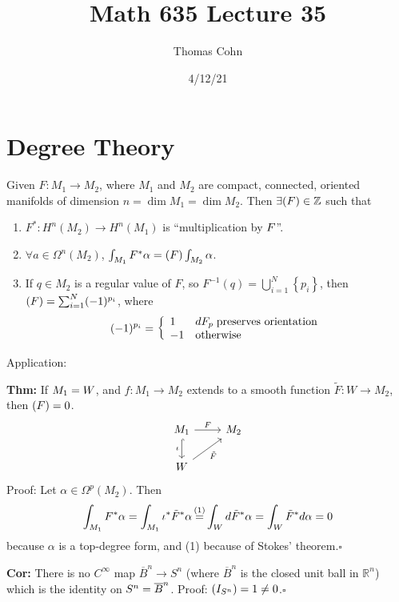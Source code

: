 \documentclass[10pt,letterpaper]{article}
\author{Thomas Cohn}
\title{Math 635 Lecture 35}
\date{4/12/21} %
\newcommand{\n}{\hfill\break}
\newcommand{\nn}{\vspace{0.5\baselineskip}\n}
\newcommand{\hangblock}[2]{\par\noindent\settowidth{\hangindent}{\textbf{#1: }}\textbf{#1: }\nolinebreak#2}
\newcommand{\thm}[1]{\hangblock{Thm}{#1}}
\newcommand{\cor}[1]{\hangblock{Cor}{#1}}
\newcommand{\proven}{\;$\square$\n}
\newcommand{\ptxt}[1]{\textrm{\textnormal{#1}}}
\newcommand{\set}[1]{\left\{#1\right\}}
\newcommand{\integers}{\mathbb{Z}}
\newcommand{\Z}{\integers}
\newcommand{\reals}{\mathbb{R}}
\newcommand{\R}{\reals}
\let\d\relax
\newcommand{\d}{\partial}
\let\deg\relax
\DeclareMathOperator{\deg}{deg}
\newcommand{\inv}{^{-1}}
\newcommand{\closure}[1]{\overline{#1}}
\newcommand{\labeledeq}[1]{\overset{\mathclap{\ptxt{#1}}}{=}}
\begin{document}
\maketitle
\setlength\RaggedRightParindent{\parindent}
\RaggedRight

\section*{Degree Theory}

\par\noindent
Given $F:M_{1}\to{}M_{2}$, where $M_{1}$ and $M_{2}$ are compact, connected, oriented manifolds of dimension $n=\dim{}M_{1}=\dim{}M_{2}$. Then $\exists\deg(F)\in\Z$ such that
\begin{enumerate}[label=\alph*)]
	\item $F^{*}:H^{n}(M_{2})\to{}H^{n}(M_{1})$ is ``multiplication by $\deg{}F$''.
	\item $\forall{}a\in\Omega^{n}(M_{2})$, $\int_{M_{1}}F^{*}\alpha=\deg(F)\int_{M_{2}}\alpha$.
	\item If $q\in{}M_{2}$ is a regular value of $F$, so $F\inv(q)=\bigcup_{i=1}^{N}\set{p_{i}}$, then $\deg(F)=\sum_{i=1}^{N}(-1)^{p_{i}}$, where
	\[
		(-1)^{p_{i}}=\left\{\begin{array}{ll}
			1 & dF_{p}\;\ptxt{preserves orientation}\\
			-1 & \ptxt{otherwise}
		\end{array}\right.
	\]
\end{enumerate}

\par\noindent
Application:\n
\thm{
	If $M_{1}=\d{}W$, and $f:M_{1}\to{}M_{2}$ extends to a smooth function $\tilde{F}:W\to{}M_{2}$, then $\deg(F)=0$.
	\[
		\begin{tikzcd}[ampersand replacement=\&]
			M_{1} \arrow[r,"F"] \arrow[d,hookrightarrow,"\iota"'] \& M_{2}\\
			W \arrow[ur,"\tilde{F}"']
		\end{tikzcd}
	\]
	Proof: Let $\alpha\in\Omega^{p}(M_{2})$. Then
	\[
		\int_{M_{1}}F^{*}\alpha=\int_{M_{1}}\iota^{*}\tilde{F}^{*}\alpha\labeledeq{(1)}\int_{W}d\tilde{F}^{*}\alpha=\int_{W}\tilde{F}^{*}d\alpha=0
	\]
	because $\alpha$ is a top-degree form, and (1) because of Stokes' theorem.\proven
}

\cor{
	There is no $C^{\infty}$ map $\closure{B}^{n}\to{}S^{n}$ (where $\closure{B}^{n}$ is the closed unit ball in $\R^{n}$) which is the identity on $S^{n}=\d\closure{B}^{n}$.\nn
	Proof: $\deg(I_{S^{n}})=1\ne{}0$.\proven
}
\end{document}
